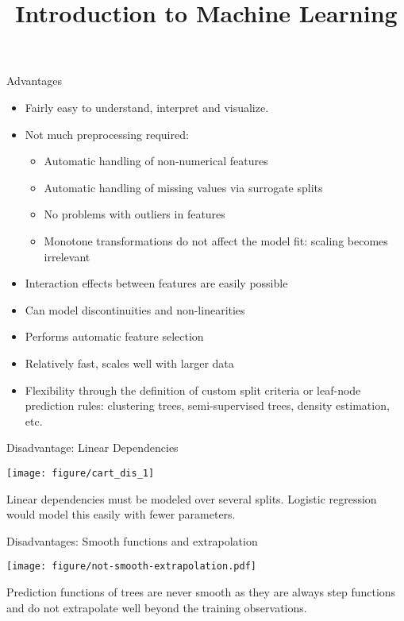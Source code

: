 \documentclass[11pt,compress,t,notes=noshow, xcolor=table]{beamer}
\title{Introduction to Machine Learning}
\institute{\href{https://compstat-lmu.github.io/lecture_i2ml/}{compstat-lmu.github.io/lecture\_i2ml}}
\date{}
\begin{document}

\sloppy

\begin{vbframe}{Advantages}
  \begin{itemize}
    \item Fairly easy to understand, interpret and visualize.
    \item Not much preprocessing required:
    \begin{itemize}
      \item Automatic handling of non-numerical features
      \item Automatic handling of missing values via surrogate splits
      \item No problems with outliers in features
      \item Monotone transformations do not affect the model fit: scaling becomes irrelevant
    \end{itemize}
    \item Interaction effects between features are easily possible
    \item Can model discontinuities and non-linearities
    \item Performs automatic feature selection
    \item Relatively fast, scales well with larger data
    \item Flexibility through the definition of custom split criteria or leaf-node prediction rules: clustering trees, semi-supervised trees, density estimation, etc.
    \end{itemize}
\end{vbframe}

\begin{vbframe}{Disadvantage: Linear Dependencies}

{\centering \texttt{[image: figure/cart\_dis\_1]} 

}


Linear dependencies must be modeled over several splits. 
Logistic regression would model this easily with fewer parameters.
\end{vbframe}

\begin{vbframe}{Disadvantages: Smooth functions and extrapolation}


{\centering \texttt{[image: figure/not-smooth-extrapolation.pdf]} 

}

Prediction functions of trees are never smooth as they are always step functions and do not extrapolate well beyond the training observations. %

\end{vbframe}
\end{document}
